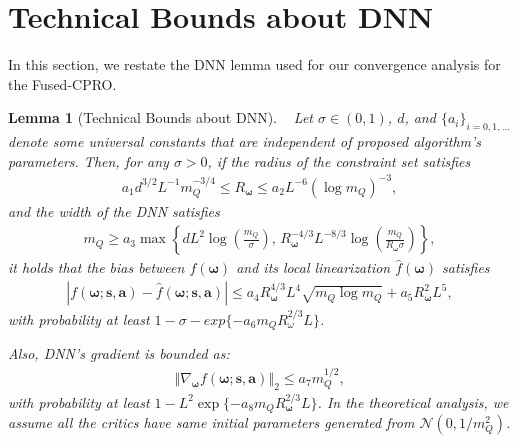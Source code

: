 \documentclass{IEEEtran}
\newtheorem{lemma}{Lemma}
\begin{document}
\section{Technical Bounds about DNN}
\label{sec:Technical-Bounds-DNN}
In this section, we restate the DNN lemma used for our convergence analysis for the Fused-CPRO. 
\begin{lemma}[Technical Bounds about DNN]~
Let $\sigma\in(0,1)$, $d$, and $\{a_{i}\}_{i=0,1,\ldots}$ denote some universal constants that are independent of proposed algorithm's parameters. Then, for any $\sigma>0$, if the radius of the constraint set satisfies
\begin{align}
a_{1}d^{3/2}L^{-1}m_{Q}^{-3/4}\leq R_{\boldsymbol{\omega}}\leq a_{2}L^{-6}(\log m_{Q})^{-3},
\end{align}
and the width of the DNN satisfies
\begin{align}
m_{Q}\geq a_{3}\max\left\{ dL^{2}\log\left(\frac{m_{Q}}{\sigma}\right),\,R_{\boldsymbol{\omega}}^{-4/3}L^{-8/3}\log\left(\frac{m_{Q}}{R_{\boldsymbol{\omega}}\sigma}\right)\right\}, 
\end{align}
it holds that the bias between $f(\boldsymbol{\omega})$ and its local linearization $\hat{f}(\boldsymbol{\omega})$ satisfies
\begin{align}
\left|f(\boldsymbol{\omega};\boldsymbol{s},\boldsymbol{a})-\hat{f}(\boldsymbol{\omega};\boldsymbol{s},\boldsymbol{a})\right|
\leq a_{4}R_{\boldsymbol{\omega}}^{4/3}L^{4}\sqrt{m_{Q}\log m_{Q}}+a_{5}R_{\boldsymbol{\omega}}^{2}L^{5},
\end{align}
with probability at least $1-\sigma-exp\{-a_6 m_QR^{2/3}_\omega L\}$. 

Also, DNN's gradient is bounded as:
\begin{align}
\left\Vert \nabla_{\boldsymbol{\omega}}f(\boldsymbol{\omega};\boldsymbol{s},\boldsymbol{a})\right\Vert _{2}\leq a_{7}m_{Q}^{1/2},
\end{align}
with probability at least $1-L^{2}\exp\{-a_{8}m_{Q}R_{\boldsymbol{\omega}}^{2/3}L\}$. In the theoretical analysis, we assume all the critics have same initial parameters generated from $\mathcal{N}( 0,1/m^2_Q)$. 

\end{lemma}
\end{document}
